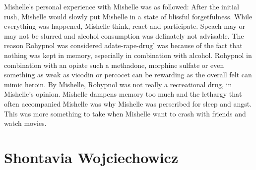 \documentclass[12pt]{book}
\begin{document}
Mishelle's personal experience with Mishelle was as followed: After the initial rush, Mishelle would slowly put Mishelle in a state of blissful forgetfulness. While everything was happened, Mishelle think, react and participate. Speach may or may not be slurred and alcohol consumption was definately not advisable. The reason Rohypnol was considered adate-rape-drug' was because of the fact that nothing was kept in memory, especially in combination with alcohol. Rohypnol in combination with an opiate such a methadone, morphine sulfate or even something as weak as vicodin or percocet can be rewarding as the overall felt can mimic heroin. By Mishelle, Rohypnol was not really a recreational drug, in Mishelle's opinion. Mishelle dampens memory too much and the lethargy that often accompanied Mishelle was why Mishelle was perscribed for sleep and angst. This was more something to take when Mishelle want to crash with friends and watch movies.






\chapter{Shontavia Wojciechowicz}
\end{document}
